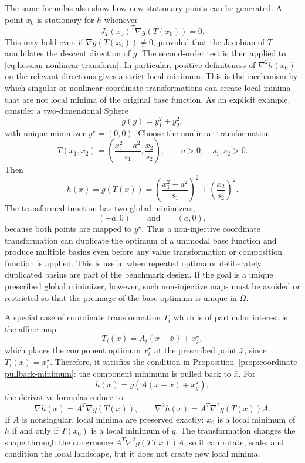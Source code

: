 \documentclass[11pt,a4paper]{article}
\theoremstyle{remark}
\theoremstyle{plain}
\begin{document}
The same formulas also show how new stationary points can be generated. A point
\(x_0\) is stationary for \(h\) whenever
\[
J_T(x_0)^T\nabla g(T(x_0))=0.
\]
This may hold even if \(\nabla g(T(x_0))\ne0\), provided that the Jacobian of
\(T\) annihilates the descent direction of \(g\).
The second-order test is then applied to
\eqref{eq:hessian-nonlinear-transform}. In particular, positive definiteness of
\(\nabla^2h(x_0)\) on the relevant directions gives a strict local minimum.
This is the mechanism by which singular or nonlinear coordinate transformations
can create local minima that are not local minima of the original base function.
As an explicit example, consider a two-dimensional Sphere
\[
	g(y)=y_1^2+y_2^2,
\]
with unique minimizer \(y^\star=(0,0)\). Choose the nonlinear transformation
\[
	T(x_1,x_2)
	=
	\left(
	\frac{x_1^2-a^2}{s_1},
	\frac{x_2}{s_2}
	\right),
	\qquad
	a>0,
	\quad s_1,s_2>0.
\]
Then
\[
	h(x)=g(T(x))
	=
	\left(\frac{x_1^2-a^2}{s_1}\right)^2
	+
	\left(\frac{x_2}{s_2}\right)^2.
\]
The transformed function has two global minimizers,
\[
	(-a,0)
	\qquad\text{and}\qquad
	(a,0),
\]
because both points are mapped to \(y^\star\). Thus a non-injective
coordinate transformation can duplicate the optimum of a unimodal base
function and produce multiple basins even before any value transformation or
composition function is applied.
This is useful when repeated optima or deliberately duplicated basins are part
of the benchmark design. If the goal is a unique prescribed global minimizer,
however, such non-injective maps must be avoided or restricted so that the
preimage of the base optimum is unique in \(\Omega\).

A special case of coordinate transformation \(T_i\) which is of particular
interest is the affine map
\begin{equation}
	T_i(x)=A_i(x-\bar{x})+x_i^\star,
	\label{eq:affine-T}
\end{equation}
which places the component optimum \(x_i^\star\) at the prescribed point
\(\bar{x}\), since \(T_i(\bar{x})=x_i^\star\). Therefore, it satisfies the
condition in Proposition~\ref{prop:coordinate-pullback-minimum}: the component
minimum is pulled back to \(\bar{x}\). For
\[
h(x)=g(A(x-\bar{x})+x_g^\star),
\]
the derivative formulas reduce to
\begin{equation}
	\nabla h(x)=A^T\nabla g(T(x)),
	\qquad
	\nabla^2 h(x)=A^T\nabla^2 g(T(x))A.
	\label{eq:hessian-affine-transform}
\end{equation}
If \(A\) is nonsingular, local minima are preserved exactly: \(x_0\) is a local
minimum of \(h\) if and only if \(T(x_0)\) is a local minimum of \(g\). The
transformation changes the shape through the congruence
\(A^T\nabla^2 g(T(x))A\), so it can rotate, scale, and condition the local
landscape, but it does not create new local minima.
\end{document}
